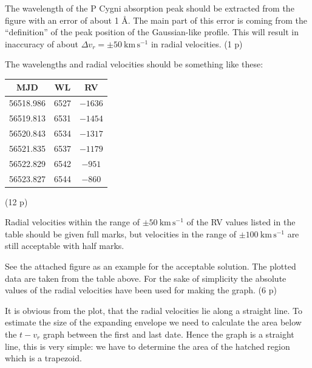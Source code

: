 \begin{description}
  The wavelength of the P Cygni absorption peak should be extracted from the
  figure with an error of about 1 \AA. The main part of this error is coming
  from the ``definition'' of the peak position of the Gaussian-like profile.
  This will result in inaccuracy of about
  $\Delta v_r = \pm 50\ \mathrm{km\,s^{-1}}$ in radial velocities. \hfill(1 p)

  The wavelengths and radial velocities should be something like these:
  \begin{center}
  \begin{tabular}{ccc}
    \hline
    MJD & WL & RV \\
    \hline
    56518.986 & 6527 & $-1636$ \\
    56519.813 & 6531 & $-1454$ \\
    56520.843 & 6534 & $-1317$ \\
    56521.835 & 6537 & $-1179$ \\
    56522.829 & 6542 & $-951$ \\
    56523.827 & 6544 & $-860$ \\
    \hline
  \end{tabular}
  \end{center}
  \hfill(12 p)

  Radial velocities within the range of $\pm 50\ \mathrm{km\,s^{-1}}$ of the
  RV values listed in the table should be given full marks, but velocities in
  the range of $\pm 100\ \mathrm{km\,s^{-1}}$ are still acceptable with half
  marks.

\item[g)] See the attached figure as an example for the acceptable solution.
  The plotted data are taken from the table above. For the sake of simplicity
  the absolute values of the radial velocities have been used for making the
  graph. \hfill(6 p)

\item[h)] It is obvious from the plot, that the radial velocities lie along a
  straight line. To estimate the size of the expanding envelope we need to
  calculate the area below the $t - v_r$ graph between the first and last
  date. Hence the graph is a straight line, this is very simple: we have to
  determine the area of the hatched region which is a trapezoid.


\end{description}
